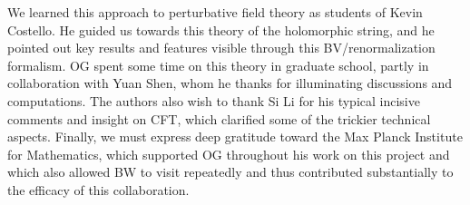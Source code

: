 We learned this approach to perturbative field theory as students of Kevin Costello.
He guided us towards this theory of the holomorphic string,  
and he pointed out key results and features visible through this BV/renormalization formalism. 
OG spent some time on this theory in graduate school,
partly in collaboration with Yuan Shen,
whom he thanks for illuminating discussions and computations.
The authors also wish to thank Si Li for his typical incisive comments and insight on CFT,
which clarified some of the trickier technical aspects.
Finally, we must express deep gratitude toward the Max Planck Institute for Mathematics,
which supported OG throughout his work on this project and which also allowed BW to visit repeatedly and thus contributed substantially to the efficacy of this collaboration.

